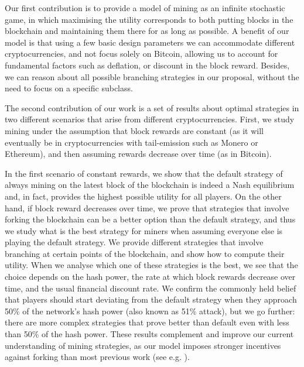 \smallskip
{}  Our first contribution is to provide a model of mining as an infinite stochastic game, in which maximising the utility corresponds to both 
putting blocks in the blockchain and maintaining them there for as long as possible. A
benefit of our model is that using a few basic design parameters we can 
accommodate different cryptocurrencies, and not focus solely on Bitcoin,
 allowing us to account for fundamental factors such as deflation, or discount in the block reward. 
 Besides,
 we can reason about all possible branching strategies in our proposal, 
 without the need to focus on a specific subclass. 

The second contribution of our work is a set of results about optimal strategies in two different scenarios that arise from different cryptocurrencies. First, 
we study mining under the assumption that block rewards are constant (as it will eventually be in cryptocurrencies with tail-emission such as Monero or Ethereum), and then 
assuming rewards decrease over time (as in Bitcoin). 

In the first scenario of constant rewards, we show that the default strategy of always mining on the latest block of the blockchain is indeed a Nash equilibrium and, in fact, 
provides the highest possible utility for all players. 
On the other hand, if block reward decreases over time, we prove that strategies that involve forking the blockchain
can be a better option than the default strategy, and thus we study what is the best strategy for miners when assuming everyone else 
is playing the default strategy. We provide different strategies that involve branching at certain points of the blockchain, and show how to compute their 
utility. When we analyse which one of these strategies is the best, we see that the choice depends on the hash power, the rate at which 
block rewards decrease over time, and the usual financial discount rate. We confirm the commonly held belief that
players should start deviating from the default strategy 
when they approach 50\% of the network's hash power (also known as 51\% attack), but we go further: there are more complex strategies that 
prove better than default even with less than 50\% of the hash power. These results complement and improve our current understanding of mining strategies, 
as our model imposes stronger 
incentives against forking than 
most previous work (see e.g. \cite{mininggames:2016,biais2018blockchain}).

